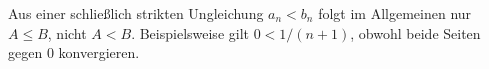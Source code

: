 \documentclass[main.tex]{subfiles}
\begin{document}
Aus einer schließlich strikten Ungleichung \(a_n<b_n\) folgt im Allgemeinen
nur \(A\leq B\), nicht \(A<B\). Beispielsweise gilt
\(0<1/(n+1)\), obwohl beide Seiten gegen \(0\) konvergieren.

\end{document}

